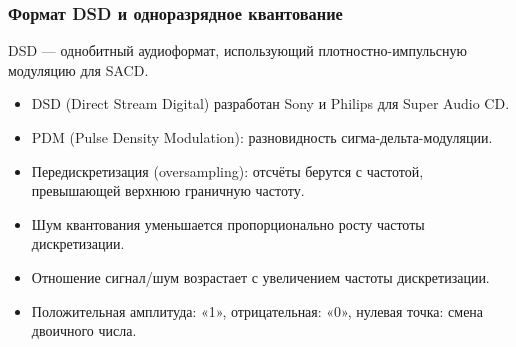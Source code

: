 	\subsubsection{Формат DSD и одноразрядное квантование}
	DSD — однобитный аудиоформат, использующий плотностно-импульсную модуляцию для SACD.
	\begin{itemize}
		\item DSD (Direct Stream Digital) разработан Sony и Philips для Super Audio CD.
		\item PDM (Pulse Density Modulation): разновидность сигма-дельта-модуляции.
		\item Передискретизация (oversampling): отсчёты берутся с частотой, превышающей верхнюю граничную частоту.
		\item Шум квантования уменьшается пропорционально росту частоты дискретизации.
		\item Отношение сигнал/шум возрастает с увеличением частоты дискретизации.
		\item Положительная амплитуда: «1», отрицательная: «0», нулевая точка: смена двоичного числа.
	\end{itemize}
	\vspace{-1.5em}
